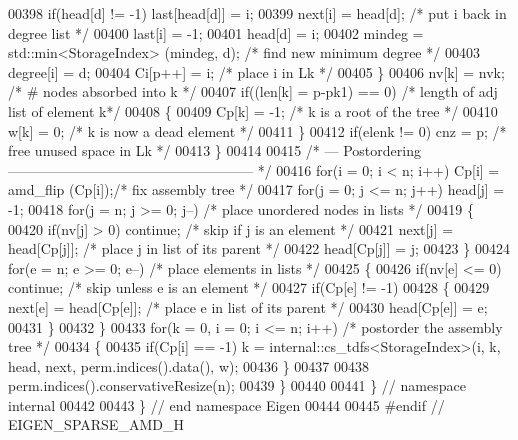 \begin{DoxyCode}
00398       \textcolor{keywordflow}{if}(head[d] != -1) last[head[d]] = i;
00399       next[i] = head[d];               \textcolor{comment}{/* put i back in degree list */}
00400       last[i] = -1;
00401       head[d] = i;
00402       mindeg = std::min<StorageIndex> (mindeg, d);       \textcolor{comment}{/* find new minimum degree */}
00403       degree[i] = d;
00404       Ci[p++] = i;                      \textcolor{comment}{/* place i in Lk */}
00405     \}
00406     nv[k] = nvk;                      \textcolor{comment}{/* # nodes absorbed into k */}
00407     \textcolor{keywordflow}{if}((len[k] = p-pk1) == 0)         \textcolor{comment}{/* length of adj list of element k*/}
00408     \{
00409       Cp[k] = -1;                   \textcolor{comment}{/* k is a root of the tree */}
00410       w[k] = 0;                     \textcolor{comment}{/* k is now a dead element */}
00411     \}
00412     \textcolor{keywordflow}{if}(elenk != 0) cnz = p;           \textcolor{comment}{/* free unused space in Lk */}
00413   \}
00414   
00415   \textcolor{comment}{/* --- Postordering ----------------------------------------------------- */}
00416   \textcolor{keywordflow}{for}(i = 0; i < n; i++) Cp[i] = amd\_flip (Cp[i]);\textcolor{comment}{/* fix assembly tree */}
00417   \textcolor{keywordflow}{for}(j = 0; j <= n; j++) head[j] = -1;
00418   \textcolor{keywordflow}{for}(j = n; j >= 0; j--)              \textcolor{comment}{/* place unordered nodes in lists */}
00419   \{
00420     \textcolor{keywordflow}{if}(nv[j] > 0) \textcolor{keywordflow}{continue};          \textcolor{comment}{/* skip if j is an element */}
00421     next[j] = head[Cp[j]];          \textcolor{comment}{/* place j in list of its parent */}
00422     head[Cp[j]] = j;
00423   \}
00424   \textcolor{keywordflow}{for}(e = n; e >= 0; e--)              \textcolor{comment}{/* place elements in lists */}
00425   \{
00426     \textcolor{keywordflow}{if}(nv[e] <= 0) \textcolor{keywordflow}{continue};         \textcolor{comment}{/* skip unless e is an element */}
00427     \textcolor{keywordflow}{if}(Cp[e] != -1)
00428     \{
00429       next[e] = head[Cp[e]];      \textcolor{comment}{/* place e in list of its parent */}
00430       head[Cp[e]] = e;
00431     \}
00432   \}
00433   \textcolor{keywordflow}{for}(k = 0, i = 0; i <= n; i++)       \textcolor{comment}{/* postorder the assembly tree */}
00434   \{
00435     \textcolor{keywordflow}{if}(Cp[i] == -1) k = internal::cs\_tdfs<StorageIndex>(i, k, head, next, perm.indices().data(), w);
00436   \}
00437   
00438   perm.indices().conservativeResize(n);
00439 \}
00440 
00441 \} \textcolor{comment}{// namespace internal}
00442 
00443 \} \textcolor{comment}{// end namespace Eigen}
00444 
00445 \textcolor{preprocessor}{#endif // EIGEN\_SPARSE\_AMD\_H}
\end{DoxyCode}
